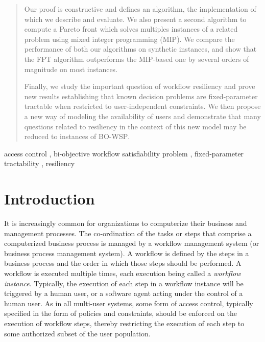 \documentclass[jcs,crcready]{iosart1c}
\newcommand{\BOWSP}{\textsc{BO-WSP}\xspace}
\begin{document}
\begin{frontmatter}
\begin{abstract}
Our proof is constructive and defines an algorithm, the implementation of which we describe and evaluate. 
We also present a second algorithm to compute a Pareto front which solves multiples instances of a related problem using mixed integer programming (MIP).
We compare the performance of both our algorithms on synthetic instances, and show that the FPT algorithm outperforms the MIP-based one by
several orders of magnitude on most instances.

Finally, we study the important question of workflow resiliency and prove new results establishing that known decision problems are fixed-parameter tractable when restricted to user-independent constraints.
We then propose a new way of modeling the availability of users and demonstrate that many questions related to resiliency in the context of this new model may be reduced to instances of \BOWSP.
\end{abstract}

\begin{keyword}
access control \sep 
bi-objective workflow satisfiability problem \sep
fixed-parameter tractability \sep
resiliency
\end{keyword}

\end{frontmatter}


\section{Introduction}\label{sec:intro}

It is increasingly common for organizations to computerize their business and management processes.
The co-ordination of the tasks or steps that comprise a computerized business process is managed by a workflow management system (or business process management system).
A workflow is defined by the steps in a business process and the order in which those steps should be performed.
A workflow is executed multiple times, each execution being called a \emph{workflow instance}.
Typically, the execution of each step in a workflow instance will be triggered by a human user, or a software agent acting under the control of a human user.
As in all multi-user systems, some form of access control, typically specified in the form of policies and constraints, should be enforced on the execution of workflow steps, thereby restricting the execution of each step to some authorized subset of the user population.
\end{document}
